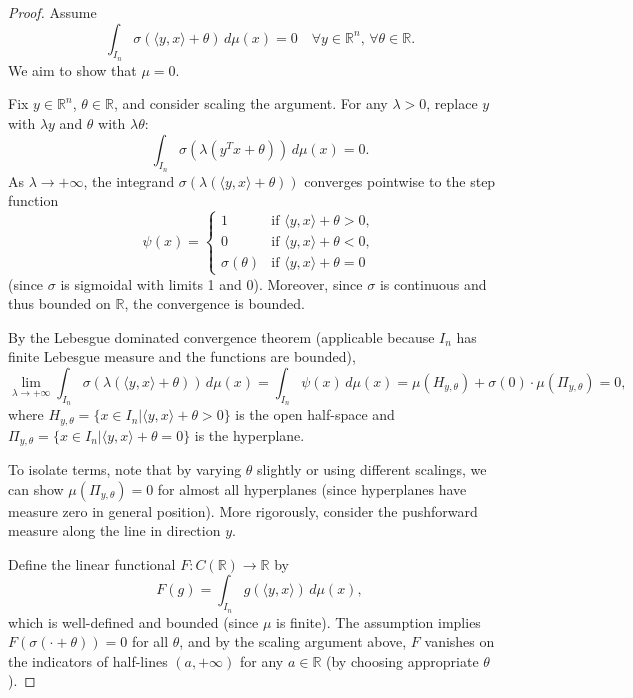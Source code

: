 \begin{proof}
Assume
$$
\int_{I_n} \sigma(\langle y, x \rangle+ \theta) \, d\mu(x) = 0 \quad \forall y \in \mathbb{R}^n, \, \forall \theta \in \mathbb{R}.
$$
We aim to show that $\mu = 0$.

Fix \( y \in \mathbb{R}^n \), \( \theta \in \mathbb{R} \), and consider scaling the argument. For any \( \lambda > 0 \), replace \( y \) with \( \lambda y \) and \( \theta \) with \( \lambda \theta \):
\[
\int_{I_n} \sigma(\lambda (y^T x + \theta)) \, d\mu(x) = 0.
\]
As \( \lambda \to +\infty \), the integrand \( \sigma(\lambda (\langle y,x\rangle  + \theta)) \) converges pointwise to the step function
\[
\psi(x) = 
\begin{cases} 
1 & \text{if } \langle y, x\rangle + \theta > 0, \\
0 & \text{if } \langle y, x\rangle + \theta < 0, \\
\sigma(\theta) & \text{if } \langle y, x \rangle + \theta = 0 
\end{cases}
\]
(since \( \sigma \) is sigmoidal with limits 1 and 0). Moreover, since \( \sigma \) is continuous and thus bounded on \( \mathbb{R} \), the convergence is bounded.

By the Lebesgue dominated convergence theorem (applicable because \( I_n \) has finite Lebesgue measure and the functions are bounded),
\[
\lim_{\lambda \to +\infty} \int_{I_n} \sigma(\lambda (\langle y, x \rangle + \theta)) \, d\mu(x) = \int_{I_n} \psi(x) \, d\mu(x) = \mu(H_{y,\theta}) + \sigma(0) \cdot \mu(\Pi_{y,\theta}) = 0,
\]
where \( H_{y,\theta} = \{ x \in I_n | \langle y, x\rangle + \theta > 0 \} \) is the open half-space and \( \Pi_{y,\theta} = \{ x \in I_n | \langle y, x \rangle + \theta = 0 \} \) is the hyperplane.

To isolate terms, note that by varying \( \theta \) slightly or using different scalings, we can show \( \mu(\Pi_{y,\theta}) = 0 \) for almost all hyperplanes (since hyperplanes have measure zero in general position). More rigorously, consider the pushforward measure along the line in direction \( y \).

Define the linear functional \( F: C(\mathbb{R}) \to \mathbb{R} \) by
$$
F(g) = \int_{I_n} g(\langle y, x \rangle) \, d\mu(x),
$$
which is well-defined and bounded (since $\mu $ is finite). The assumption implies \( F(\sigma(\cdot + \theta)) = 0 \) for all \( \theta \), and by the scaling argument above, \( F \) vanishes on the indicators of half-lines \( (a, +\infty) \) for any \( a \in \mathbb{R} \) (by choosing appropriate \( \theta \)).


\end{proof}
